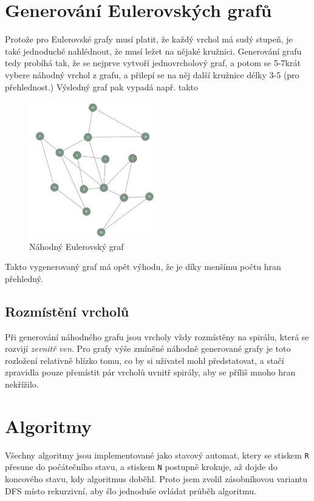 \documentclass{article}
\def\code#1{\texttt{#1}}
\begin{document}
\section{Generování Eulerovských grafů}

Protože pro Eulerovské grafy musí platit, že každý vrchol má sudý
stupeň, je také jednoduché nahlédnout, že musí ležet na nějaké kružnici.
Generování grafu tedy probíhá tak, že se nejprve vytvoří jednovrcholový
graf, a potom se 5-7krát vybere náhodný vrchol z grafu, a přilepí se na
něj další kružnice délky 3-5 (pro přehlednost.) Výsledný graf pak vypadá např. takto

\begin{figure}[!h]
  \centering
    \includegraphics[width=0.5\textwidth]{LQNxfKa.png}
  \caption{Náhodný Eulerovský graf}
\end{figure}

Takto vygenerovaný graf má opět výhodu, že je díky menšímu počtu hran přehledný.

\subsection{Rozmístění vrcholů}

Při generování náhodného grafu jsou vrcholy vždy rozmístěny na spirálu,
která se rozvijí \emph{zevnitř ven}. Pro grafy výše zmíněné náhodně
generované grafy je toto rozložení relativně blízko tomu, co by si
uživatel mohl předstatovat, a stačí zpravidla pouze přemístit pár
vrcholů uvnitř spirály, aby se příliš mnoho hran nekřížilo.

\section{Algoritmy}

Všechny algoritmy jsou implementované jako stavový automat, ktery se
stiskem \code{R} přesune do počátečního stavu, a stiskem \code{N} postupně
krokuje, až dojde do koncového stavu, kdy algoritmus doběhl. Proto jsem zvolil
zásobníkovou variantu DFS místo rekurzivní, aby šlo jednoduše ovládat průběh algoritmu.
\end{document}
